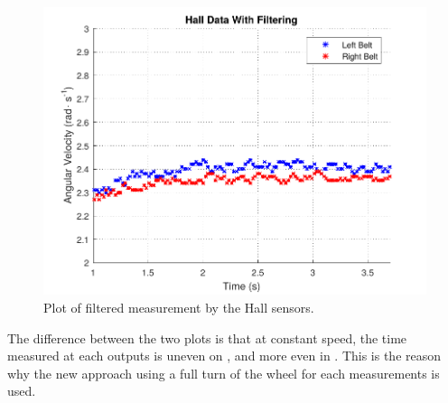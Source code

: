 \begin{figure}[H]
	\centering
	\includegraphics[scale=0.9]{figures/filteredHall.pdf}
	\caption{Plot of filtered measurement by the Hall sensors.}
	\label{filteredHall}
\end{figure}

The difference between the two plots is that at constant speed, the time measured at each outputs is uneven on , and more even in . This is the reason why the new approach using a full turn of the wheel for each measurements is used.




